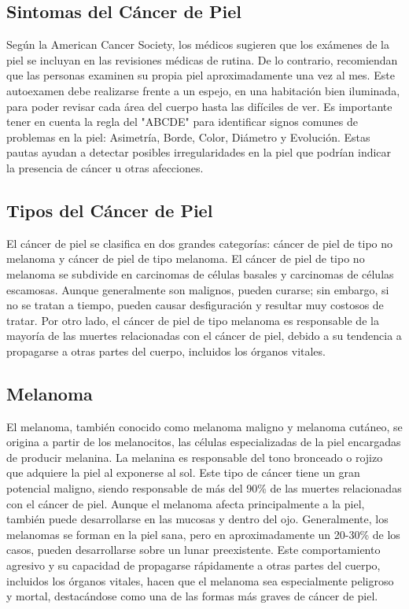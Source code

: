\subsection{Sintomas del Cáncer de Piel}
Según la American Cancer Society, los médicos sugieren que los exámenes de la piel se incluyan en las revisiones médicas de rutina. De lo contrario, recomiendan que las personas examinen su propia piel aproximadamente una vez al mes. Este autoexamen debe realizarse frente a un espejo, en una habitación bien iluminada, para poder revisar cada área del cuerpo hasta las difíciles de ver. Es importante tener en cuenta la regla del "ABCDE" para identificar signos comunes de problemas en la piel: Asimetría, Borde, Color, Diámetro y Evolución. Estas pautas ayudan a detectar posibles irregularidades en la piel que podrían indicar la presencia de cáncer u otras afecciones.
\parencite{information_cancer}




\subsection{Tipos del Cáncer de Piel}
El cáncer de piel se clasifica en dos grandes categorías: cáncer de piel de tipo no melanoma y cáncer de piel de tipo melanoma. El cáncer de piel de tipo no melanoma se subdivide en carcinomas de células basales y carcinomas de células escamosas. Aunque generalmente son malignos, pueden curarse; sin embargo, si no se tratan a tiempo, pueden causar desfiguración y resultar muy costosos de tratar. Por otro lado, el cáncer de piel de tipo melanoma es responsable de la mayoría de las muertes relacionadas con el cáncer de piel, debido a su tendencia a propagarse a otras partes del cuerpo, incluidos los órganos vitales.

\subsection{Melanoma}
El melanoma, también conocido como melanoma maligno y melanoma cutáneo, se origina a partir de los melanocitos, las células especializadas de la piel encargadas de producir melanina. La melanina es responsable del tono bronceado o rojizo que adquiere la piel al exponerse al sol. Este tipo de cáncer tiene un gran potencial maligno, siendo responsable de más del 90\% de las muertes relacionadas con el cáncer de piel. Aunque el melanoma afecta principalmente a la piel, también puede desarrollarse en las mucosas y dentro del ojo. Generalmente, los melanomas se forman en la piel sana, pero en aproximadamente un 20-30\% de los casos, pueden desarrollarse sobre un lunar preexistente.  \parencite{cancer_tipo_melanoma}
Este comportamiento agresivo y su capacidad de propagarse rápidamente a otras partes del cuerpo, incluidos los órganos vitales, hacen que el melanoma sea especialmente peligroso y mortal, destacándose como una de las formas más graves de cáncer de piel.

